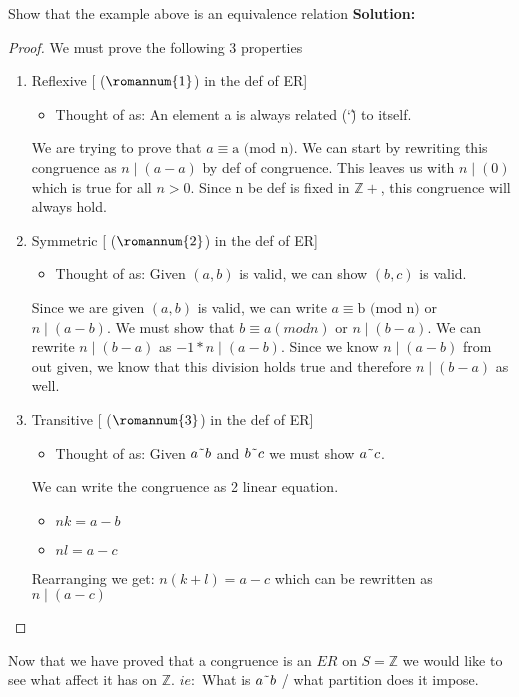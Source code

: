 \documentclass{article}
\newcounter{example}
\theoremstyle{definition}
\theoremstyle{claim}
\theoremstyle{remark}
\theoremstyle{theorem}
\newcommand\TheSolution{%
  \textbf{Solution:}\\%
}
\begin{document}
\begin{flushleft}
Show that the example above is an equivalence relation
\newline \newline
\TheSolution 
\begin{proof}{}
We must prove the following 3 properties
\begin{enumerate}
  \item Reflexive [ ($\romannum{1}$) in the def of ER]
  \begin{itemize}
     \item Thought of as: An element a is always related (\char`\~) to itself.
   \end{itemize}
   We are trying to prove that $a \equiv\text{a (mod n)}$. We can start by rewriting this congruence as $n \mid (a-a)$ by def of congruence. This leaves us with $n \mid (0)$ which is true for all $n > 0$. Since n be def is fixed in $\mathbb{Z+}$, this congruence will always hold.
  \item Symmetric [ ($\romannum{2}$) in the def of ER]
    \begin{itemize}
     \item Thought of as: Given $(a, b)$ is valid, we can show $(b, c)$ is valid.
    \end{itemize}
   Since we are given $(a, b)$ is valid, we can write $a \equiv \text{b (mod n)}$ or $n \mid (a-b)$. We must show that $b \equiv a (mod n)$ or $n \mid (b-a)$.
   We can rewrite $n \mid (b-a)$ as $-1 * n \mid (a-b)$. Since we know $n \mid (a-b)$ from out given, we know that this division holds true and therefore $n \mid (b-a)$ as well. 
  \item Transitive [ ($\romannum{3}$) in the def of ER]
    \begin{itemize}
     \item Thought of as: Given $a \char`\~ b$ and $b \char`\~ c$ we must show $a \char`\~ c$.
   \end{itemize}
   We can write the congruence as 2 linear equation.
   \begin{itemize}
     \item $nk = a - b$
     \item $nl = a - c$
   \end{itemize}
   Rearranging we get: $n(k+l) = a - c$ which can be rewritten as $n \mid (a-c)$
\end{enumerate}
\end{proof}
Now that we have proved that a congruence is an $ER$ on $S = \mathbb{Z}$ we would like to see what affect it has on $\mathbb{Z}$. $ie:$ What is $a \char`\~ b$ / what partition does it impose.

\end{flushleft}
\end{document}
